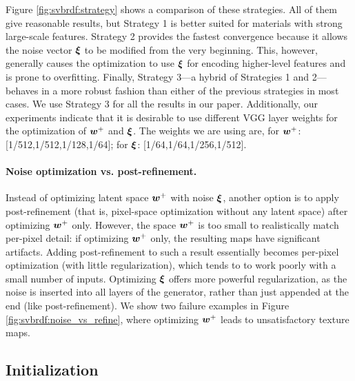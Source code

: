 

Figure \ref{fig:svbrdf:strategy} shows a comparison of these strategies.
All of them give reasonable results, but Strategy 1 is better suited for materials with strong large-scale features.
Strategy 2 provides the fastest convergence because it allows the noise vector $\bm{\xi}$ to be modified from the very beginning.
This, however, generally causes the optimization to use $\bm{\xi}$ for encoding higher-level features and is prone to overfitting.
Finally, Strategy 3---a hybrid of Strategies 1 and 2---behaves in a more robust fashion than either of the previous strategies in most cases.
We use Strategy 3 for all the results in our paper.
Additionally, our experiments indicate that it is desirable to use different VGG layer weights for the optimization of $\bm{w}^+$ and $\bm{\xi}$. The weights we are using are, for $\bm{w}^+$: [1/512,1/512,1/128,1/64]; for $\bm{\xi}$: [1/64,1/64,1/256,1/512].




\paragraph{Noise optimization vs. post-refinement.}
\label{ssec:post-refine}
Instead of optimizing latent space $\bm{w}^+$ with noise $\bm{\xi}$, another option is to apply post-refinement (that is, pixel-space optimization without any latent space) after optimizing $\bm{w}^+$ only. However, the space $\bm{w}^+$ is too small to realistically match per-pixel detail: if optimizing $\bm{w}^+$ only, the resulting maps have significant artifacts. Adding post-refinement to such a result essentially becomes per-pixel optimization (with little regularization), which tends to to work poorly with a small number of inputs. Optimizing $\bm{\xi}$ offers more powerful regularization, as the noise is inserted into all layers of the generator, rather than just appended at the end (like post-refinement). We show two failure examples in Figure \ref{fig:svbrdf:noise_vs_refine}, where optimizing $\bm{w}^+$ leads to unsatisfactory texture maps.


\subsection{Initialization}
\label{ssec:init}



